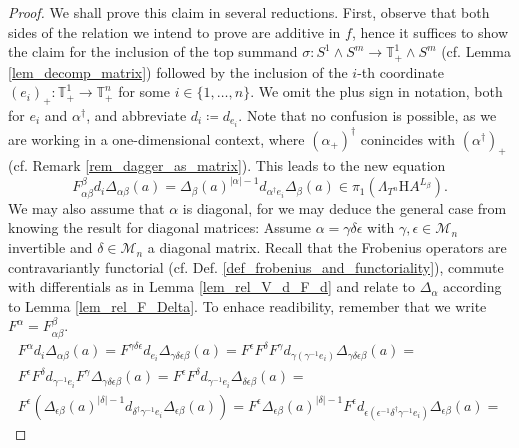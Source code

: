 \documentclass[10pt, a4paper, UKenglish]{article}
\numberwithin{equation}{section}
\newcommand{\cM}{\mathcal{M}}
\newcommand{\sT}{\mathbb{T}}		%
\newcommand{\defas}{\coloneqq}  %
\newcommand{\asdef}{\eqqcolon}      %
\newcommand{\abs}[1]{\left\vert#1\right\vert}	%
\newcommand{\indset}[1]{\{1,\ldots,#1\}}
\renewcommand{\H}{\mathrm{H}}
\theoremstyle{plain}
\theoremstyle{definition}
\renewcommand{\to}{\longrightarrow}
\begin{document}
\begin{proof}
We shall prove this claim in several reductions. First, observe that both sides of the relation we intend to prove are additive in $f$, hence it suffices to show the claim for the inclusion of the top summand $\sigma: S^1 \wedge S^m \to \sT^1_+ \wedge S^m$ (cf. Lemma \ref{lem_decomp_matrix}) followed by the inclusion of the $i$-th coordinate $(e_i)_+: \sT^1_+ \to \sT^n_+$ for some $i \in \indset{n}$. We omit the plus sign in notation, both for $e_i$ and $\alpha^\dagger$, and abbreviate $d_i \defas d_{e_i}$. Note that no confusion is possible, as we are working in a one-dimensional context, where $(\alpha_+)^\dagger$ conincides with $(\alpha^\dagger)_+$ (cf. Remark \ref{rem_dagger_as_matrix}). %
This leads to the new equation
\[ F_{\alpha\beta}^\beta d_i \Delta_{\alpha\beta} (a) =%
  \Delta_{\beta} (a)^{\abs{\alpha} - 1} d_{\alpha^\dagger e_i} \Delta_{\beta}(a)%
  \in \pi_1 (\Lambda_{T^n} \H A ^{L_\beta}).%
	\]
We may also assume that $\alpha$ is diagonal, for we may deduce the general case from knowing the result for diagonal matrices: Assume $\alpha = \gamma \delta \epsilon$ with $\gamma, \epsilon \in \cM_n$ invertible and $\delta \in \cM_n$ a diagonal matrix. Recall that the Frobenius operators are contravariantly functorial (cf. Def. \ref{def_frobenius_and_functoriality}), commute with differentials as in Lemma \ref{lem_rel_V_d_F_d} and relate to $\Delta_\alpha$ according to Lemma \ref{lem_rel_F_Delta}. To enhace readibility, remember that we write $F^\alpha = F_{\alpha\beta}^\beta$.
\begin{gather}\label{eq_Fdw_reduction_diagonal_alpha}
	\nonumber %
	F^{\alpha} d_i \Delta_{\alpha \beta} (a) = %
	F^{\gamma\delta\epsilon} d_{e_i} \Delta_{\gamma\delta\epsilon\beta} (a) = %
	F^{\epsilon} F^{\delta} F^{\gamma} d_{\gamma (\gamma^{-1} e_i)}%
		\Delta_{\gamma\delta\epsilon\beta} (a) = %
		\\%
	\nonumber %
	F^{\epsilon} F^{\delta} d_{\gamma^{-1} e_i} F^{\gamma} %
		\Delta_{\gamma\delta\epsilon\beta} (a) = %
	F^{\epsilon} F^{\delta} d_{\gamma^{-1} e_i} \Delta_{\delta\epsilon\beta} (a) =%
		\\%
	\nonumber %
	F^{\epsilon} ( \Delta_{\epsilon\beta} (a)^{\abs{\delta}-1}%
		d_{\delta^\dagger \gamma^{-1} e_i} \Delta_{\epsilon\beta}(a) ) = %
	F^{\epsilon} \Delta_{\epsilon\beta} (a)^{\abs{\delta}-1}%
		F^{\epsilon} d_{\epsilon( \epsilon^{-1} \delta^\dagger \gamma^{-1} e_i )}%
		\Delta_{\epsilon\beta}(a) = %

\end{gather}
\end{proof}
\end{document}
